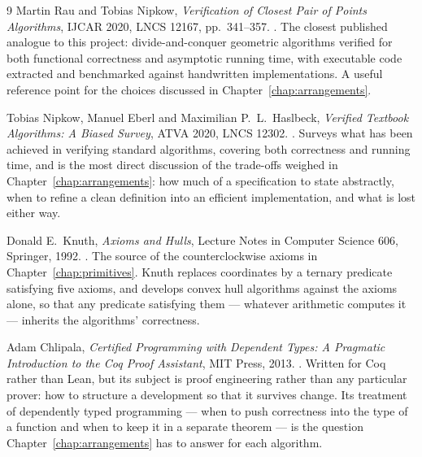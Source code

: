 \begin{thebibliography}{9}
 Martin Rau and Tobias Nipkow, \emph{Verification of Closest Pair of Points
  Algorithms}, IJCAR 2020, LNCS 12167, pp.\ 341--357.
  .
  The closest published analogue to this project: divide-and-conquer geometric
  algorithms verified for both functional correctness and asymptotic running
  time, with executable code extracted and benchmarked against handwritten
  implementations. A useful reference point for the choices discussed in
  Chapter~\ref{chap:arrangements}.

 Tobias Nipkow, Manuel Eberl and Maximilian P.\ L.\ Haslbeck,
  \emph{Verified Textbook Algorithms: A Biased Survey}, ATVA 2020, LNCS 12302.
  .
  Surveys what has been achieved in verifying standard algorithms, covering both
  correctness and running time, and is the most direct discussion of the
  trade-offs weighed in Chapter~\ref{chap:arrangements}: how much of a
  specification to state abstractly, when to refine a clean definition into an
  efficient implementation, and what is lost either way.

 Donald E.\ Knuth, \emph{Axioms and Hulls}, Lecture Notes in Computer
  Science 606, Springer, 1992.
  .
  The source of the counterclockwise axioms in
  Chapter~\ref{chap:primitives}. Knuth replaces coordinates by a ternary
  predicate satisfying five axioms, and develops convex hull algorithms against
  the axioms alone, so that any predicate satisfying them --- whatever
  arithmetic computes it --- inherits the algorithms' correctness.

 Adam Chlipala, \emph{Certified Programming with Dependent Types: A
  Pragmatic Introduction to the Coq Proof Assistant}, MIT Press, 2013.
  .
  Written for Coq rather than Lean, but its subject is proof engineering rather
  than any particular prover: how to structure a development so that it survives
  change. Its treatment of dependently typed programming --- when to push
  correctness into the type of a function and when to keep it in a separate
  theorem --- is the question Chapter~\ref{chap:arrangements} has to answer for
  each algorithm.
\end{thebibliography}

